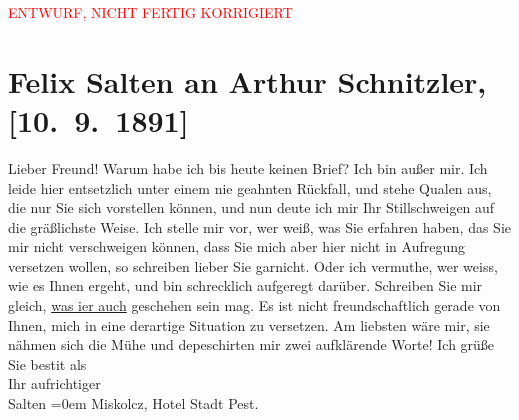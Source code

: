 
\begin{center}
            \textcolor{red}{ENTWURF, NICHT FERTIG KORRIGIERT}
                      \end{center}
            
         \renewcommand{\erwaehnteOrte}{Orte: Hotel Stadt Pest, Miskolc, Wien}
         \renewcommand{\erwaehnteWerke}{}
               \section[Felix Salten an Arthur Schnitzler, {[}10. 9. 1891{]}]{ Felix Salten an Arthur Schnitzler, {[}10. 9. 1891{]}}\nopagebreak{}\rehead{ }\begin{ledgroupsized}[t]{13cm}\normalsize\beginnumbering \toendnotes[C]{\smallbreak\pagebreak[2]} 
\pstart
           \noindent{}{\pb}Lieber Freund! Warum habe ich bis heute keinen Brief? Ich bin außer
               mir. \pend
           \pstart
           Ich leide hier entsetzlich unter einem nie geahnten Rückfall, und stehe Qualen aus,
               die nur Sie sich vorstellen können, und nun deute ich mir Ihr Stillschweigen auf die
               gräßlichste Weise. Ich stelle mir vor, wer weiß, was Sie erfahren haben,  das Sie mir nicht verschweigen können, dass Sie mich
               aber hier nicht in Aufregung versetzen wollen, so schreiben lieber Sie garnicht. Oder
               ich vermuthe, wer weiss, wie es Ihnen  ergeht, und
               bin schrecklich aufgeregt darüber. Schreiben Sie mir gleich, \uline{was i{\geminationm}er auch} geschehen sein mag. \pend
           \pstart
           Es ist nicht freundschaftlich gerade von {\pb}Ihnen, mich in eine
               derartige Situation zu versetzen. Am liebsten wäre mir, sie nähmen sich die Mühe und
               depeschirten mir zwei aufklärende Worte!\pend
           \pstart
           Ich grüße Sie besti{\geminationm}t als{\\[\baselineskip]}Ihr aufrichtiger{\\[\baselineskip]}\spacefill\mbox{Salten}\pend
           \leftskip=0em{}\pstart
           Miskolcz, Hotel Stadt Pest.\pend
           
         
         \endnumbering{}\end{ledgroupsized}\begin{anhang}\end{anhang}\newcommand{\dateiname}{L03104}\newcommand{\titel}{Felix Salten an Arthur Schnitzler, [10. 9. 1891]}\newcommand{\editorInnen}{Martin Anton Müller und Laura Untner}
      